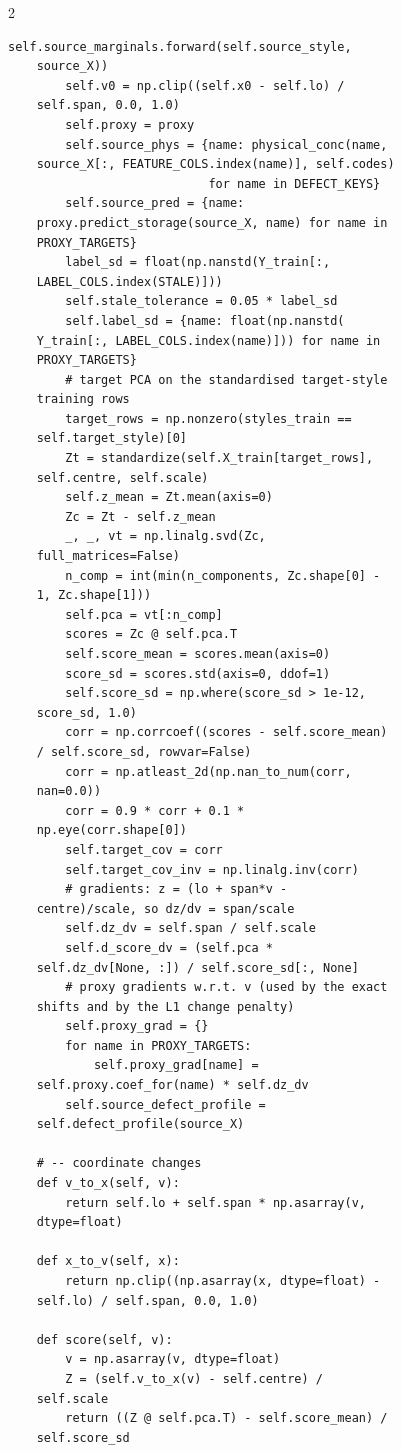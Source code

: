 \begin{multicols}{2}
\begin{Verbatim}[fontsize=\scriptsize]
    self.source_marginals.forward(self.source_style,
    source_X))
        self.v0 = np.clip((self.x0 - self.lo) /
    self.span, 0.0, 1.0)
        self.proxy = proxy
        self.source_phys = {name: physical_conc(name,
    source_X[:, FEATURE_COLS.index(name)], self.codes)
                            for name in DEFECT_KEYS}
        self.source_pred = {name:
    proxy.predict_storage(source_X, name) for name in
    PROXY_TARGETS}
        label_sd = float(np.nanstd(Y_train[:,
    LABEL_COLS.index(STALE)]))
        self.stale_tolerance = 0.05 * label_sd
        self.label_sd = {name: float(np.nanstd(
    Y_train[:, LABEL_COLS.index(name)])) for name in
    PROXY_TARGETS}
        # target PCA on the standardised target-style
    training rows
        target_rows = np.nonzero(styles_train ==
    self.target_style)[0]
        Zt = standardize(self.X_train[target_rows],
    self.centre, self.scale)
        self.z_mean = Zt.mean(axis=0)
        Zc = Zt - self.z_mean
        _, _, vt = np.linalg.svd(Zc,
    full_matrices=False)
        n_comp = int(min(n_components, Zc.shape[0] -
    1, Zc.shape[1]))
        self.pca = vt[:n_comp]
        scores = Zc @ self.pca.T
        self.score_mean = scores.mean(axis=0)
        score_sd = scores.std(axis=0, ddof=1)
        self.score_sd = np.where(score_sd > 1e-12,
    score_sd, 1.0)
        corr = np.corrcoef((scores - self.score_mean)
    / self.score_sd, rowvar=False)
        corr = np.atleast_2d(np.nan_to_num(corr,
    nan=0.0))
        corr = 0.9 * corr + 0.1 *
    np.eye(corr.shape[0])
        self.target_cov = corr
        self.target_cov_inv = np.linalg.inv(corr)
        # gradients: z = (lo + span*v -
    centre)/scale, so dz/dv = span/scale
        self.dz_dv = self.span / self.scale
        self.d_score_dv = (self.pca *
    self.dz_dv[None, :]) / self.score_sd[:, None]
        # proxy gradients w.r.t. v (used by the exact
    shifts and by the L1 change penalty)
        self.proxy_grad = {}
        for name in PROXY_TARGETS:
            self.proxy_grad[name] =
    self.proxy.coef_for(name) * self.dz_dv
        self.source_defect_profile =
    self.defect_profile(source_X)

    # -- coordinate changes
    def v_to_x(self, v):
        return self.lo + self.span * np.asarray(v,
    dtype=float)

    def x_to_v(self, x):
        return np.clip((np.asarray(x, dtype=float) -
    self.lo) / self.span, 0.0, 1.0)

    def score(self, v):
        v = np.asarray(v, dtype=float)
        Z = (self.v_to_x(v) - self.centre) /
    self.scale
        return ((Z @ self.pca.T) - self.score_mean) /
    self.score_sd


\end{Verbatim}
\end{multicols}
